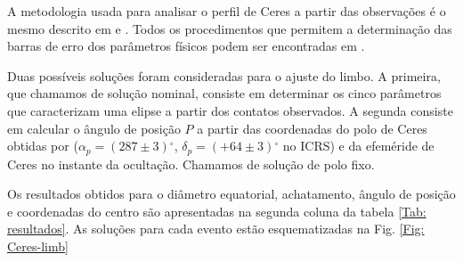 \documentclass[12pt,a4paper]{report}
\newcommand{\degr}{\ensuremath{^{\circ}}}%
\begin{document}
A metodologia usada para analisar o perfil de Ceres a partir das observações é o mesmo descrito em \cite{Sicardy2011} e \cite{Braga-Ribas2013}. %
Todos os procedimentos que permitem a determinação das barras de erro dos parâmetros físicos podem ser encontradas em \cite{Braga-Ribas2013}.

Duas possíveis soluções foram consideradas para o ajuste do limbo. A primeira, que chamamos de solução nominal, consiste em determinar os cinco parâmetros que caracterizam uma elipse a partir dos contatos observados. A segunda consiste em calcular o ângulo de posição $P$ a partir das coordenadas do polo de Ceres obtidas por \cite{Drummond2014} ($\alpha_{p} = (287 \pm 3) \degr$, $\delta_{p} = (+64 \pm 3) \degr$ no ICRS) e da efeméride de Ceres no instante da ocultação. Chamamos de solução de polo fixo.

Os resultados obtidos para o diâmetro equatorial, achatamento, ângulo de posição e coordenadas do centro são apresentadas na segunda coluna da tabela \ref{Tab: resultados}. As soluções para cada evento estão esquematizadas na Fig. \ref{Fig: Ceres-limb}
\end{document}
